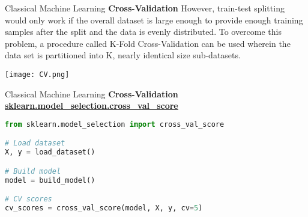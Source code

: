 \documentclass{beamer}
\begin{document}
\begin{frame}[fragile]{Classical Machine Learning}
    \textbf{Cross-Validation}
    However, train-test splitting would only work if the overall dataset is large enough to provide enough training samples after the split and the data is evenly distributed. To overcome this problem, a procedure called K-Fold Cross-Validation can be used wherein the data set is partitioned into K, nearly identical size sub-datasets.
    \begin{center}
        \texttt{[image: CV.png]}
    \end{center}
\end{frame}
\begin{frame}[fragile]{Classical Machine Learning}
    \textbf{Cross-Validation}
    \href{https://scikit-learn.org/stable/modules/generated/sklearn.model_selection.cross_val_score.html}{\textbf{\underline{sklearn.model\_selection.cross\_val\_score}}}
    \begin{example}
        \begin{lstlisting}[language=Python]
from sklearn.model_selection import cross_val_score

# Load dataset
X, y = load_dataset()

# Build model
model = build_model()

# CV scores
cv_scores = cross_val_score(model, X, y, cv=5)
        \end{lstlisting}
    \end{example}
\end{frame}
\end{document}
